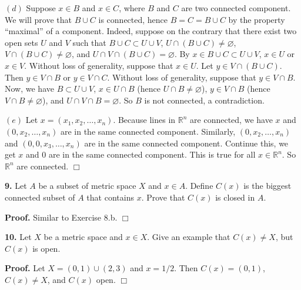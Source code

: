 \documentclass{article}
\begin{document}
$(d)$ Suppose $x \in B$ and $x\in C$, where $B$ and $C$ are two
connected component. We will prove that $B \cup C$ is connected, hence
$B = C = B \cup C$ by the property ``maximal'' of a component. Indeed,
suppose on the contrary that there exist two open sets $U$ and $V$ such
that $B\cup C \subset U \cup V$, $U \cap (B\cup C) \ne \varnothing$,
$V \cap (B\cup C) \ne \varnothing$, and
$U\cap V\cap (B\cup C) = \varnothing$. By
$x\in B\cup C \subset U \cup V$, $x\in U$ or $x\in V$. Without loss of
generality, suppose that $x\in U$. Let $y\in V \cap (B\cup C)$. Then
$y\in V \cap B$ or $y\in V \cap C$. Without loss of generality, suppose
that $y \in V \cap B$. Now, we have $B \subset U \cup V$,
$x\in U \cap B$ (hence $U\cap B \ne \varnothing$), $y\in V \cap B$
(hence $V\cap B \ne \varnothing$), and $U\cap V \cap B=\varnothing$. So
$B$ is not connected, a contradiction.

$(e)$ Let $x = (x_1,x_2,\ldots,x_n)$. Because lines in $\mathbb{R}^n$
are connected, we have $x$ and $(0,x_2,\ldots,x_n)$ are in the same
connected component. Similarly, $(0,x_2,\ldots,x_n)$ and
$(0,0,x_3,\ldots,x_n)$ are in the same connected component. Continue
this, we get $x$ and $0$ are in the same connected component. This is
true for all $x \in \mathbb{R}^n$. So $\mathbb{R}^n$ are connected.
$\Box$

    \textbf{9.} Let $A$ be a subset of metric space $X$ and $x\in A$. Define
$C(x)$ is the biggest connected subset of $A$ that contains $x$. Prove
that $C(x)$ is closed in $A$.

\textbf{Proof.} Similar to Exercise 8.b. $\Box$

    \textbf{10.} Let $X$ be a metric space and $x\in X$. Give an example
that $C(x)\neq X$, but $C(x)$ is open.

\textbf{Proof.} Let $X = (0,1)\cup (2,3)$ and $x = 1/2$. Then
$C(x) = (0,1)$, $C(x) \ne X$, and $C(x)$ open. $\Box$


    
    
    
    
\end{document}
